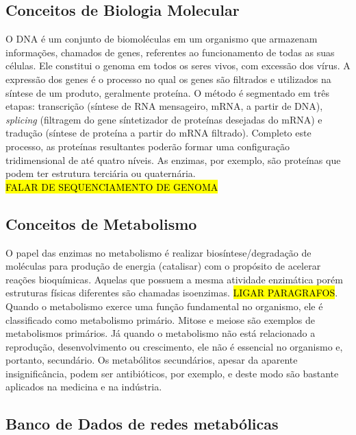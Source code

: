 \documentclass[conference]{IEEEtran}
\begin{document}
\subsection{Conceitos de Biologia Molecular}

O DNA é um conjunto de biomoléculas em um organismo que armazenam informações, chamados de genes, referentes ao funcionamento de todas as suas células. Ele constitui o genoma em todos os seres vivos, com excessão dos vírus. A expressão dos genes é o processo no qual os genes são filtrados e utilizados na síntese de um produto, geralmente proteína. O método é segmentado em três etapas: transcrição (síntese de RNA mensageiro, mRNA, a partir de DNA), \textit{splicing} (filtragem do gene síntetizador de proteínas desejadas do mRNA) e tradução (síntese de proteína a partir do mRNA filtrado). Completo este processo, as proteínas resultantes poderão formar uma configuração tridimensional de até quatro níveis. As enzimas, por exemplo, são proteínas que podem ter estrutura terciária ou quaternária. \\
\indent \hl{FALAR DE SEQUENCIAMENTO DE GENOMA}

\subsection{Conceitos de Metabolismo}

O papel das enzimas no metabolismo é realizar biosíntese/degradação de moléculas para produção de energia (catalisar) com o propósito de acelerar reações bioquímicas. Aquelas que possuem a mesma atividade enzimática porém estruturas físicas diferentes são chamadas isoenzimas. \hl{LIGAR PARAGRAFOS}.\\
\indent Quando o metabolismo exerce uma função fundamental no organismo, ele é classificado como metabolismo primário. Mitose e meiose são exemplos de metabolismos primários. Já quando o metabolismo não está relacionado a reprodução, desenvolvimento ou crescimento, ele não é essencial no organismo e, portanto, secundário. Os metabólitos secundários, apesar da aparente insignificância, podem ser antibióticos, por exemplo, e deste modo são bastante aplicados na medicina e na indústria.


\subsection{Banco de Dados de redes metabólicas}
\end{document}
